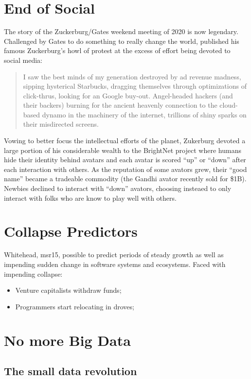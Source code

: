 \documentclass[journal]{IEEEtran}
\newcommand{\bi}{\begin{itemize}}
\newcommand{\ei}{\end{itemize}}
\begin{document}
\section{End of Social}
The story of the Zuckerburg/Gates weekend meeting of 2020 is now legendary.
Challenged by Gates to do something to really change the world, published his
famous
Zuckerburg's howl of protest at the excess of effort being devoted to
social media:
\begin{quote}
I saw the best minds of my generation destroyed by ad revenue madness, sipping hysterical Starbucks, dragging themselves through optimizations of click-thrus, looking for an Google buy-out. Angel-headed hackers (and their backers) burning for the ancient heavenly connection to the cloud-based dynamo in the machinery of the internet, trillions of shiny sparks on their misdirected screens.
\end{quote}
Vowing to better focus the intellectual efforts of the planet, 
Zukerburg devoted a large portion of his considerable wealth to the BrightNet
project where humans hide their identity  behind avatars and each avatar is
scored ``up'' or ``down'' after each interaction with others. As the reputation of some avators grew, their ``good name'' became a tradeable commodity (the Gandhi avator recently sold for \$1B). Newbies declined to interact with ``down'' avators, choosing insteaed to only interact with folks who are know to play well with others. 

\section{Collapse Predictors}

Whitehead, msr15, possible to predict periods of steady growth
as well as impending sudden change in software systems and
ecosystems. Faced with impending collapse:
\bi
\item Venture capitalists withdraw funds;
\item Programmers start relocating in droves;
\ei
 

\section{No more Big Data}

\subsection{The small data revolution}
\end{document}
